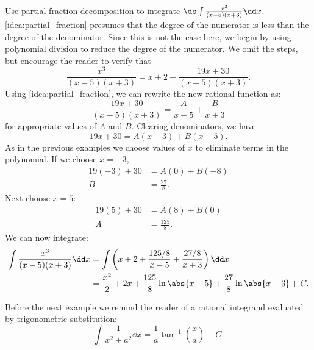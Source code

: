 \begin{example}\label{ex_pf4}
Use partial fraction decomposition to integrate $\ds \int \frac{x^3}{(x-5)(x+3)}\dd x$.
\solution
\autoref{idea:partial_fraction} presumes that the degree of the numerator is less than the degree of the denominator. Since this is not the case here, we begin by using polynomial division to reduce the degree of the numerator. We omit the steps, but encourage the reader to verify that
\[\frac{x^3}{(x-5)(x+3)} = x+2+\frac{19x+30}{(x-5)(x+3)}.\]
Using \autoref{idea:partial_fraction}, we can rewrite the new rational function as:
\[\frac{19x+30}{(x-5)(x+3)} = \frac{A}{x-5} + \frac{B}{x+3}\]
for appropriate values of $A$ and $B$. Clearing denominators, we have 
\[19x+30=A(x+3)+B(x-5).\]
As in the previous examples we choose values of $x$ to eliminate terms in the polynomial.  If we choose $x=-3$,
\begin{align*}
 19(-3)+30&=A(0) + B(-8) \\
 B&= \frac{27}{8}.
\end{align*}
Next choose $x=5$:
\begin{align*}
 19(5)+30&=A(8) + B(0)\\
 A&= \frac{125}{8}.
\end{align*}
We can now integrate:
\begin{align*}
	\int \frac{x^3}{(x-5)(x+3)}\dd x
	&= \int\left(x+2+\frac{125/8}{x-5}+\frac{27/8}{x+3}\right)\dd x \\
	&= \frac{x^2}2+2x+\frac{125}{8}\ln\abs{x-5}+\frac{27}8\ln\abs{x+3}+C.
\end{align*}
\end{example}

Before the next example we remind the reader of a rational integrand evaluated by trigonometric substitution:
\[\int\frac1{x^2+a^2}\dd x=\frac1a\tan^{-1}\left(\frac xa\right) + C.\]

